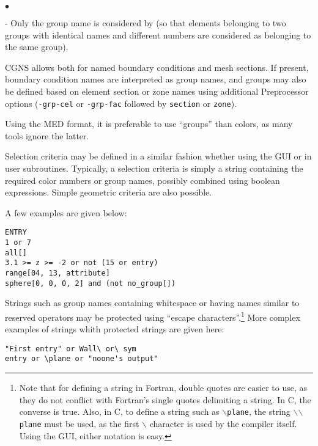 {{{\begin{list}{$\bullet$}{}
\begin{list}{-}{}
            Only the group name is considered by \CS (so that elements
            belonging to two groups with identical names and different
            numbers are considered as belonging to the same group).
      \item CGNS allows both for named boundary conditions and mesh
            sections. If present, boundary condition names are
            interpreted as group names, and groups may also be defined
            based on element section or zone names using additional
            Preprocessor options (\texttt{-grp-cel} or
            \texttt{-grp-fac} followed by \texttt{section} or
            \texttt{zone}).
      \item Using the MED format, it is preferable to use ``groups''
            than colors, as many tools ignore the latter.
      \end{list}
\end{list}

Selection criteria may be defined in a similar fashion whether
using the GUI or in user subroutines.
Typically, a selection criteria is simply a string containing
the required color numbers or group names, possibly combined
using boolean expressions. Simple geometric criteria are also
possible.

A few examples are given below:

\verb+ENTRY+\\
\verb+1 or 7+\\
\verb+all[]+\\
\verb+3.1 >= z >= -2 or not (15 or entry)+\\
\verb+range[04, 13, attribute]+\\
\verb+sphere[0, 0, 0, 2] and (not no_group[])+

Strings such as group names containing whitespace
or having names similar to reserved operators may be protected
using ``escape characters''.\footnote{Note that for defining a
string in Fortran, double quotes are easier to use, as they do not
conflict with Fortran's single quotes delimiting a string.
In C, the converse is true. Also, in C, to define a string
such as \texttt{{$\backslash$}plane}, the string
\texttt{{$\backslash$}{$\backslash$}plane} must be
used, as the first $\backslash$ character is used by the
compiler itself. Using the GUI, either notation is easy.}
More complex examples of strings whith protected strings are given here:

\verb+"First entry" or Wall\ or\ sym+\\
\verb+entry or \plane or "noone's output"+

}}}
